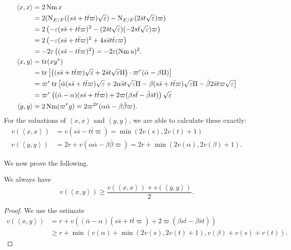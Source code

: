 \begin{align*}
  \left\langle x,x \right\rangle &= 2 \operatorname{Nm} x \\
  &= 2 (\operatorname{N}_{E/F}((s \bar s + t \bar t \varpi)\sqrt{\varepsilon})
    - \operatorname{N}_{E/F}(2 \bar s t \sqrt{\varepsilon}) \varpi) \\
  &= 2\left( -\varepsilon(s \bar s + t \bar t \varpi)^2
    - (2\bar s t \sqrt{\varepsilon})(-2s \bar t \sqrt{\varepsilon}) \varpi \right) \\
  &= 2\left( -\varepsilon(s \bar s + t \bar t \varpi)^2
    + 4s\bar s t \bar t \varepsilon \varpi \right) \\
  &= -2\varepsilon\left( (s \bar s - t \bar t \varpi)^2 \right) = -2\varepsilon (\operatorname{Nm} u)^2. \\
  \left\langle x,y \right\rangle &= \operatorname{tr}(x y^\ast) \\
  &= \operatorname{tr} \left[
    \left( (s \bar s + t \bar t \varpi) \sqrt{\varepsilon} + 2 \bar s t \sqrt{\varepsilon} \Pi \right)
    \cdot \varpi^{r} (\bar\alpha - \beta \Pi)
  \right] \\
  &= \varpi^r \operatorname{tr} \left[
    \bar\alpha (s \bar s + t \bar t \varpi) \sqrt{\varepsilon}
    + 2 \alpha \bar s t \sqrt{\varepsilon} \Pi
    - \beta (s \bar s + t \bar t \varpi) \sqrt{\varepsilon} \Pi
    - \bar\beta 2 \bar s t \varpi \sqrt{\varepsilon}
  \right] \\
  &= \varpi^r \left(
    (\bar\alpha - \alpha)(s \bar s + t \bar t \varpi)
    + 2\varpi(\beta s \bar t - \bar\beta \bar s t)
  \right) \sqrt{\varepsilon} \\
  \left\langle y,y \right\rangle &= 2 \operatorname{Nm} (\varpi^r g)
  = 2\varpi^{2r} (\alpha \bar\alpha - \beta\bar\beta \varpi).
\end{align*}
For the valuations of $\left\langle x,x \right\rangle$ and $\left\langle y,y \right\rangle$,
we are able to calculate these exactly:
\begin{align*}
  v(\left\langle x,x \right\rangle)
  &= v\left( s \bar s - t \bar t \varpi \right)
  = \min\left( 2v(s), 2v(t) +1 \right) \\
  v\left( \left\langle y,y \right\rangle \right)
  &= 2r + v\left( \alpha \bar \alpha - \beta \bar \beta \varpi \right)
  = 2r + \min\left( 2v(\alpha), 2v(\beta) + 1 \right).
\end{align*}

We now prove the following.
\begin{lemma}
  We always have
  \[
    v\left( \left\langle x,y \right\rangle \right) \ge
    \frac{v\left( \left\langle x,x \right\rangle \right)
      + v\left( \left\langle y,y \right\rangle \right)}{2}.
  \]
\end{lemma}
\begin{proof}
  We use the estimate
  \begin{align*}
    v\left( \left\langle x,y \right\rangle  \right)
    &= r + v\left(
      (\bar\alpha - \alpha)(s \bar s + t \bar t \varpi)
      + 2\varpi(\beta s \bar t - \bar\beta \bar s t) \right) \\
    &\ge r + \min(
      v(\alpha) + \min(2v(s), 2v(t)+1),
      v(\beta) + v(s) + v(t)
    ).
  \end{align*}
\end{proof}

